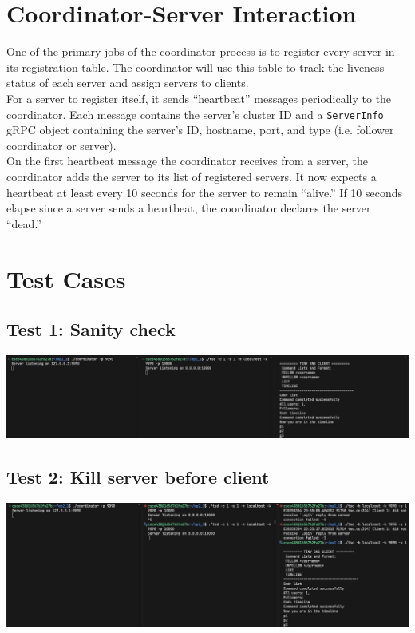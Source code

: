 \documentclass{article}
\begin{document}
\section{Coordinator-Server Interaction}

One of the primary jobs of the coordinator process is to register every server in its registration table. The coordinator will use this table to track the liveness status of each server and assign servers to clients.\\

\noindent For a server to register itself, it sends ``heartbeat'' messages periodically to the coordinator. Each message contains the server's cluster ID and a \texttt{ServerInfo} gRPC object containing the server's ID, hostname, port, and type (i.e. follower coordinator or server).\\

\noindent On the first heartbeat message the coordinator receives from a server, the coordinator adds the server to its list of registered servers. It now expects a heartbeat at least every 10 seconds for the server to remain ``alive.'' If 10 seconds elapse since a server sends a heartbeat, the coordinator declares the server ``dead.''

\newpage
\section{Test Cases}

\subsection{Test 1: Sanity check}

\includegraphics[width=\textwidth]{test1}

\subsection{Test 2: Kill server before client}

\includegraphics[width=\textwidth]{test2}
\end{document}
